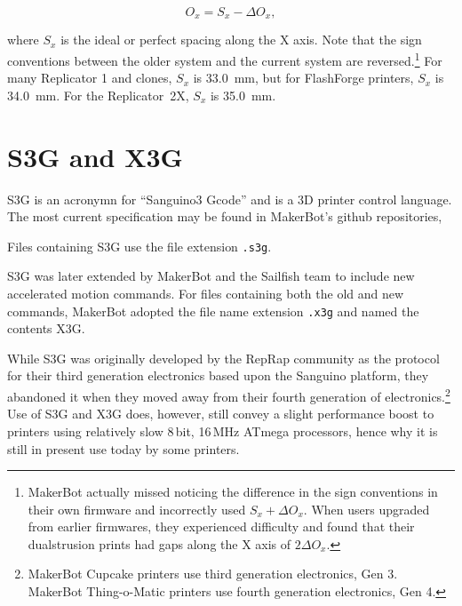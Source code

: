 \begin{equation}
O_x = S_x - \Delta O_x,
\end{equation}

where $S_x$ is the ideal or perfect spacing along the X axis.  Note that the sign conventions between the older system and the current system are reversed.\footnote{MakerBot actually missed noticing the difference in the sign conventions in their own firmware and incorrectly used $S_x+\Delta O_x$.  When users upgraded from earlier firmwares, they experienced difficulty and found that their dualstrusion prints had gaps along the X axis of $2 \Delta O_x$.}  For many Replicator 1 and clones, $S_x$ is 33.0~mm, but for FlashForge printers, $S_x$ is 34.0~mm.  For the Replicator~2X, $S_x$ is 35.0~mm.


\section{S3G and X3G} \label{sec:s3g-x3g}

\gls{S3G} is an acronymn for ``Sanguino3 Gcode'' and is a 3D printer control
language.  The most current specification may be found in MakerBot's github
repositories,

\begin{quote}
{\smaller {}}
\end{quote}

\noindent Files containing S3G use the file extension \texttt{.s3g}.

S3G was later extended by MakerBot and the Sailfish team to include
new accelerated motion commands.  For files containing both the old
and new commands, MakerBot adopted the file name extension
\texttt{.x3g} and named the contents \gls{X3G}.

While S3G was originally developed by the RepRap community as the protocol
for their third generation electronics based upon the Sanguino platform, they
abandoned it when they moved away from their fourth generation of
electronics.\footnote{MakerBot Cupcake printers use third generation
electronics, Gen 3.  MakerBot Thing-o-Matic printers use fourth generation
electronics, Gen 4.}  Use of S3G and X3G does, however, still convey a slight
performance boost to printers using relatively slow 8\,bit, 16\,MHz ATmega
processors, hence why it is still in present use today by some printers.

